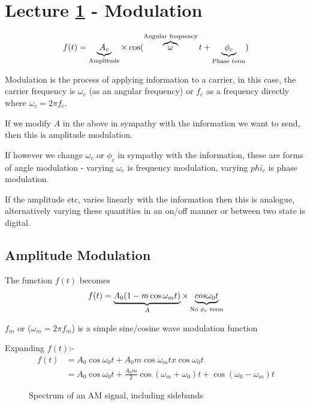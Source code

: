 \documentclass[11pt]{article} %
\begin{document}
\section{Lecture \ref{sec:lec1} - Modulation}
\label{sec:lec1}
\begin{equation}
	f(t) = \underbrace{A_c}_{\mbox{\scriptsize Amplitude}} \times \cos(\overbrace{\omega}^{\mbox{\scriptsize Angular frequency}} t + \underbrace{\phi _c}_{\mbox{\scriptsize Phase term}})
\end{equation}

Modulation is the process of applying information to a carrier, in this case, the carrier frequency is $\omega _c$ (as an angular frequency) or $f_c$ as a frequency directly where $\omega_c = 2 \pi f_c$.

If we modify $A$ in the above in sympathy with the information we want to send, then this is amplitude modulation.

If however we change $\omega_c$ or $\phi _c$ in sympathy with the information, these are forms of angle modulation - varying $\omega _c$ is frequency modulation, varying $phi _c$ is phase modulation.

If the amplitude etc, varies linearly with the information then this is analogue, alternatively varying these quantities in an on/off manner or between two state is digital.

\subsection{Amplitude Modulation}
The function $f(t)$ becomes
\begin{equation}
	f(t)=\underbrace{A_0(1-m \cos \omega_m t)}_{A} \times \underbrace{cos \omega _0 t}_{\mbox{\scriptsize No $\phi _c$ term}}
\label{eqn:am}
\end{equation}

$f_m$ or ($\omega_m = 2 \pi f_m$) is a simple sine/cosine wave modulation function

Expanding $f(t)$:-
\begin{eqnarray}
f(t) &=A_0 \cos \omega_0t + A_0m \cos\omega_mt x \cos \omega_0 t \nonumber \\
&= A_0 \cos\omega_0t+\frac{A_0m}{2} \cos(\omega_m+\omega_0)t+\cos(\omega_0-\omega_m)t
\end{eqnarray}
	\begin{figure}[h]
		\centering
		\caption{Spectrum of an AM signal, including sidebands}
	\end{figure}
\end{document}
